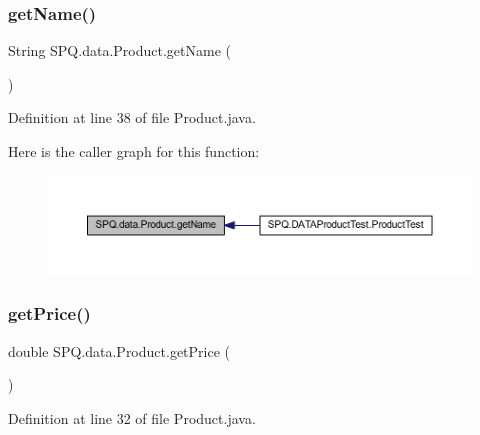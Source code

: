 \subsubsection{\texorpdfstring{get\+Name()}{getName()}\hspace{0.1cm}{\footnotesize\ttfamily [2/2]}}
{\footnotesize\ttfamily String S\+P\+Q.\+data.\+Product.\+get\+Name (\begin{DoxyParamCaption}{ }\end{DoxyParamCaption})}



Definition at line 38 of file Product.\+java.

Here is the caller graph for this function\+:
\nopagebreak
\begin{figure}[H]
\begin{center}
\leavevmode
\includegraphics[width=350pt]{class_s_p_q_1_1data_1_1_product_a03b62c19f01f4c231b742de9eba2ed25_icgraph}
\end{center}
\end{figure}
\mbox{\label{class_s_p_q_1_1data_1_1_product_ad8200addd74d2e3b6ea9cfff4e8b8c7e}} 
\subsubsection{\texorpdfstring{get\+Price()}{getPrice()}\hspace{0.1cm}{\footnotesize\ttfamily [1/2]}}
{\footnotesize\ttfamily double S\+P\+Q.\+data.\+Product.\+get\+Price (\begin{DoxyParamCaption}{ }\end{DoxyParamCaption})}



Definition at line 32 of file Product.\+java.

\mbox{\label{class_s_p_q_1_1data_1_1_product_ad8200addd74d2e3b6ea9cfff4e8b8c7e}} 

